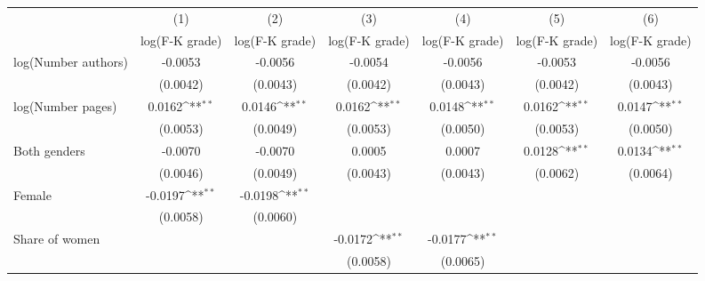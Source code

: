 {
\def\sym#1{\ifmmode^{#1}\else\(^{#1}\)\fi}
\begin{tabular}{l*{6}{c}}
\hline\hline
                    &\multicolumn{1}{c}{(1)}&\multicolumn{1}{c}{(2)}&\multicolumn{1}{c}{(3)}&\multicolumn{1}{c}{(4)}&\multicolumn{1}{c}{(5)}&\multicolumn{1}{c}{(6)}\\
                    &\multicolumn{1}{c}{log(F-K grade)}&\multicolumn{1}{c}{log(F-K grade)}&\multicolumn{1}{c}{log(F-K grade)}&\multicolumn{1}{c}{log(F-K grade)}&\multicolumn{1}{c}{log(F-K grade)}&\multicolumn{1}{c}{log(F-K grade)}\\
\hline
\hspace{3mm}log(Number authors)&     -0.0053        &     -0.0056        &     -0.0054        &     -0.0056        &     -0.0053        &     -0.0056        \\
                    &    (0.0042)        &    (0.0043)        &    (0.0042)        &    (0.0043)        &    (0.0042)        &    (0.0043)        \\
[1em]
\hspace{3mm}log(Number pages)&      0.0162\sym{**}&      0.0146\sym{**}&      0.0162\sym{**}&      0.0148\sym{**}&      0.0162\sym{**}&      0.0147\sym{**}\\
                    &    (0.0053)        &    (0.0049)        &    (0.0053)        &    (0.0050)        &    (0.0053)        &    (0.0050)        \\
[1em]
\hspace{3mm}Both genders&     -0.0070        &     -0.0070        &      0.0005        &      0.0007        &      0.0128\sym{**}&      0.0134\sym{**}\\
                    &    (0.0046)        &    (0.0049)        &    (0.0043)        &    (0.0043)        &    (0.0062)        &    (0.0064)        \\
[1em]
\hspace{3mm}Female  &     -0.0197\sym{**}&     -0.0198\sym{**}&                    &                    &                    &                    \\
                    &    (0.0058)        &    (0.0060)        &                    &                    &                    &                    \\
[1em]
\hspace{3mm}Share of women&                    &                    &     -0.0172\sym{**}&     -0.0177\sym{**}&                    &                    \\
                    &                    &                    &    (0.0058)        &    (0.0065)        &                    &                    \\

\end{tabular}}
